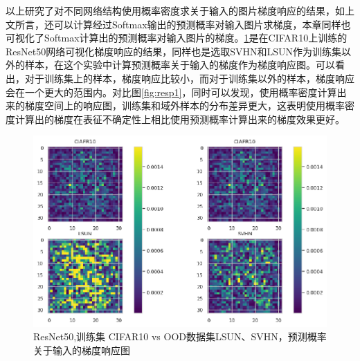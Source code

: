 以上研究了对不同网络结构使用概率密度求关于输入的图片梯度响应的结果，如上文所言，还可以计算经过Softmax输出的预测概率对输入图片求梯度，本章同样也可视化了Softmax计算出的预测概率对输入图片的梯度。\ref{fig:resp3}是在CIFAR10上训练的ResNet50网络可视化梯度响应的结果，同样也是选取SVHN和LSUN作为训练集以外的样本，在这个实验中计算预测概率关于输入的梯度作为梯度响应图。可以看出，对于训练集上的样本，梯度响应比较小，而对于训练集以外的样本，梯度响应会在一个更大的范围内。对比图\ref{fig:resp1}，同时可以发现，使用概率密度计算出来的梯度空间上的响应图，训练集和域外样本的分布差异更大，这表明使用概率密度计算出的梯度在表征不确定性上相比使用预测概率计算出来的梯度效果更好。
\begin{figure}[h]
    \captionsetup{font=small, justification=centering}
    \centering
    \includegraphics[width=0.75\linewidth]{assets/3-3.png}
    \caption{ResNet50,训练集 CIFAR10 vs OOD数据集LSUN、SVHN，预测概率关于输入的梯度响应图
}
    \label{fig:resp3}
\end{figure}


